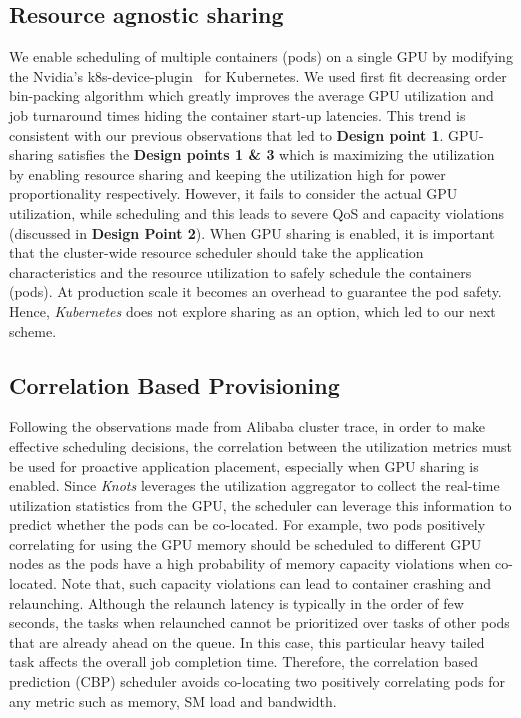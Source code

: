 \vspace{-0.1in}
\subsection{Resource agnostic sharing}
We enable scheduling of multiple containers (pods) on a single GPU by modifying the Nvidia's k8s-device-plugin~\cite{k8s} for Kubernetes. We used first fit decreasing order bin-packing algorithm which greatly improves the average GPU utilization and job turnaround times hiding the container start-up latencies. This trend is consistent with our previous observations that led to \textbf{Design point 1}. GPU-sharing satisfies the \textbf{Design points 1 \& 3} which is maximizing the utilization by enabling  resource sharing and keeping the utilization high for power proportionality respectively. However, it fails to consider the actual GPU utilization, while scheduling and this leads to severe QoS and capacity violations (discussed in \textbf{Design Point 2}). When GPU sharing is enabled, it is important that the cluster-wide resource scheduler should take the application characteristics and the resource utilization to safely schedule the containers (pods). At production scale it becomes an overhead to guarantee the pod safety. Hence, \textit{Kubernetes} does not explore sharing as an option, which led to our next scheme.
\vspace{-0.1in}
\subsection{Correlation Based Provisioning}
Following the observations made from Alibaba cluster trace, in order to make effective scheduling decisions, the correlation between the utilization metrics must be used for proactive application placement, especially when GPU sharing is enabled. Since \textit{Knots} leverages the utilization aggregator to collect the real-time utilization statistics from the GPU, the scheduler can leverage this information to predict whether the pods can be co-located. For example, two pods positively correlating for using the GPU memory should be scheduled to different GPU nodes as the pods have a high probability of memory capacity violations when co-located. Note that, such capacity violations can lead to container crashing and relaunching. Although the relaunch latency is typically in the order of few seconds, the tasks when relaunched cannot be prioritized over tasks of other pods that are already ahead on the queue. In this case, this particular heavy tailed task affects the overall job completion time. Therefore, the correlation based prediction (CBP) scheduler avoids co-locating two positively correlating pods for any metric such as memory, SM load and bandwidth.

